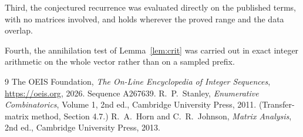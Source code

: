 \documentclass[11pt,a4paper]{article}
\theoremstyle{plain}
\theoremstyle{definition}
\begin{document}
Third, the conjectured recurrence was evaluated directly on the published terms, with no
matrices involved, and holds wherever the proved range and the data overlap.

Fourth, the annihilation test of Lemma~\ref{lem:crit} was carried out in exact integer
arithmetic on the whole vector rather than on a sampled prefix.

\begin{thebibliography}{9}
 The OEIS Foundation, \emph{The On-Line Encyclopedia of Integer
Sequences}, \url{https://oeis.org}, 2026. Sequence A267639.
 R.~P.~Stanley, \emph{Enumerative Combinatorics}, Volume 1, 2nd ed.,
Cambridge University Press, 2011. (Transfer-matrix method, Section 4.7.)
 R.~A.~Horn and C.~R.~Johnson, \emph{Matrix Analysis}, 2nd ed., Cambridge
University Press, 2013.
\end{thebibliography}
\end{document}
